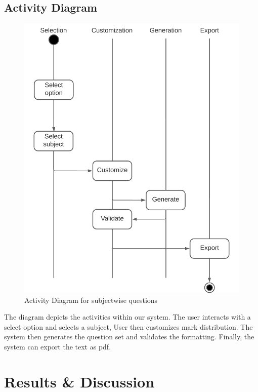 \documentclass[12pt]{report}
\begin{document}
\section{Activity Diagram}
\begin{figure}[ht!]
    \centering
    \includegraphics[scale = 1]{Images/Activity.png}
    \caption{Activity Diagram for subjectwise questions}
\end{figure}
The diagram depicts the activities within our system. The user interacts with a select option and selects a subject, User then customizes mark distribution. The system then generates the question set and validates the formatting. Finally, the system can export the text as pdf. 


\chapter{Results \& Discussion}
\end{document}
